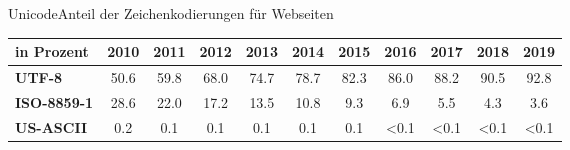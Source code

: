 \documentclass[xelatex,aspectratio=169]{beamer}
\begin{document}
\begin{frame}{Unicode}{Anteil der Zeichenkodierungen für Webseiten}
    \begin{tabular}{lcccccccccc}
        \toprule
        in Prozent          & 2010 & 2011 & 2012 & 2013 & 2014 & 2015 & 2016 & 2017 & 2018 & 2019 \\
        \midrule
        \textbf{UTF-8}      & 50.6 & 59.8 & 68.0 & 74.7 & 78.7 & 82.3 & 86.0 & 88.2 & 90.5 & 92.8 \\
        \textbf{ISO-8859-1} & 28.6 & 22.0 & 17.2 & 13.5 & 10.8 & 9.3  & 6.9  & 5.5  & 4.3  & 3.6  \\
        \textbf{US-ASCII}   & 0.2  & 0.1  & 0.1  & 0.1  & 0.1  & 0.1  & <0.1 & <0.1 & <0.1 & <0.1 \\
        \bottomrule
    \end{tabular}
\end{frame}
\end{document}
